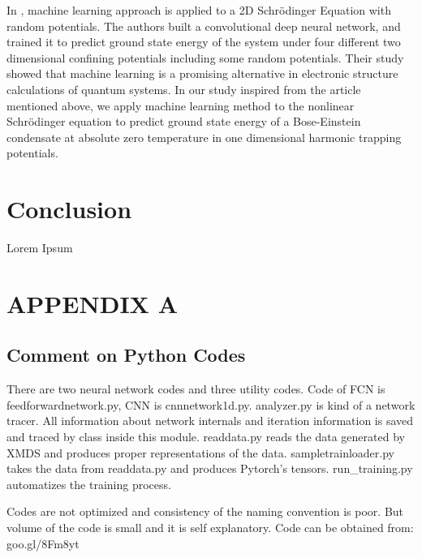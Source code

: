 \documentclass[a4paper,times,12pt]{article}
\begin{document}
In \cite{mills2017deep}, machine learning approach is applied to a 2D Schr{\"o}dinger Equation with random potentials. The authors built a convolutional deep neural network, and trained it to predict ground state energy of the system under four different two dimensional confining potentials including some random potentials. Their study showed that machine learning is a promising alternative in electronic structure calculations of quantum systems. In our study inspired from the article mentioned above, we apply machine learning method to the nonlinear Schr{\"o}dinger equation to predict ground state energy of a Bose-Einstein condensate at absolute zero temperature in one dimensional harmonic trapping potentials.

\clearpage
\section{Conclusion}

Lorem Ipsum

\clearpage




\appendix
\section{APPENDIX A}

\subsection{Comment on Python Codes}

There are two neural network codes and three utility codes. Code of FCN is feedforwardnetwork.py, CNN is cnnnetwork1d.py. analyzer.py is kind of a network tracer. All information about network internals and iteration information is saved and traced by class inside this module. readdata.py reads the data generated by XMDS and produces proper representations of the data. sampletrainloader.py takes the data from readdata.py and produces Pytorch's tensors. run\_training.py automatizes the training process. 


Codes are not optimized and consistency of the naming convention is poor. But volume of the code is small and it is self explanatory. Code can be obtained from: goo.gl/8Fm8yt
\end{document}
